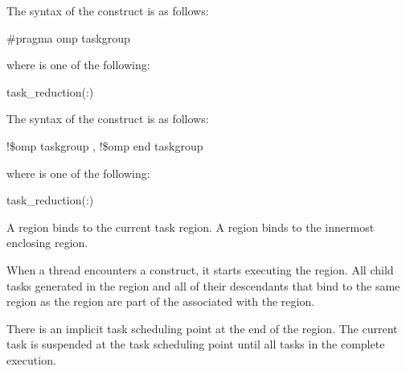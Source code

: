 \syntax
\begin{ccppspecific}
The syntax of the  construct is as follows:

\begin{boxedcode}
\#pragma omp taskgroup  
\end{boxedcode}

where  is one of the following:

\begin{indentedcodelist}
task_reduction(:)
\end{indentedcodelist}
\end{ccppspecific}

\begin{fortranspecific}
The syntax of the  construct is as follows:

\begin{boxedcode}
!\$omp taskgroup \plc{[clause [ [},\plc{] clause] ...]}
!\$omp end taskgroup
\end{boxedcode}

where  is one of the following:

\begin{indentedcodelist}
task_reduction(:)
\end{indentedcodelist}

\end{fortranspecific}

\binding
A  region binds to the current task region. A  region binds to 
the innermost enclosing  region. 

\descr
When a thread encounters a  construct, it starts executing 
the region. All child tasks generated in the  region and all 
of their descendants that bind to the same  region as the 
 region are part of the  associated with 
the  region.

There is an implicit task scheduling point at the end of the  
region. The current task is suspended at the task scheduling point until all 
tasks in the  complete execution.


